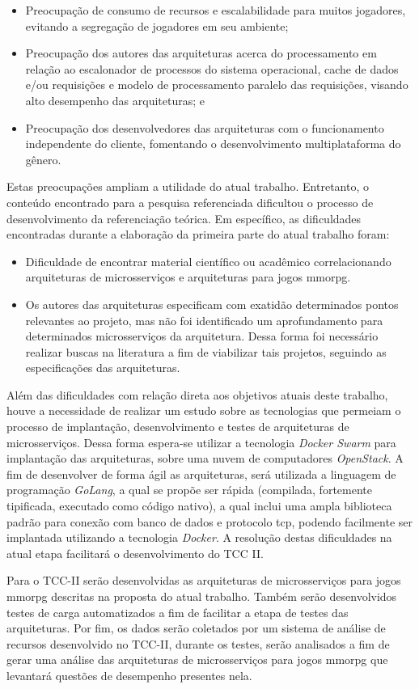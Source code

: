 \begin{itemize}
  \item Preocupação de consumo de recursos e escalabilidade para muitos jogadores, evitando a segregação de jogadores em seu ambiente;
  \item Preocupação dos autores das arquiteturas acerca do processamento em relação ao escalonador de processos do sistema operacional, cache de dados e/ou requisições e modelo de processamento paralelo das requisições, visando alto desempenho das arquiteturas; e
  \item Preocupação dos desenvolvedores das arquiteturas com o funcionamento independente do cliente, fomentando o desenvolvimento multiplataforma do gênero.
\end{itemize}

Estas preocupações ampliam a utilidade do atual trabalho.
%
Entretanto, o conteúdo encontrado para a pesquisa referenciada dificultou o processo de desenvolvimento da referenciação teórica.
%
Em específico, as dificuldades encontradas durante a elaboração da primeira parte do atual trabalho foram:

\begin{itemize}
  \item Dificuldade de encontrar material científico ou acadêmico correlacionando arquiteturas de microsserviços e arquiteturas para jogos \ac{mmorpg}.
  \item Os autores das arquiteturas especificam com exatidão determinados pontos relevantes ao projeto, mas não foi identificado um aprofundamento para determinados microsserviços da arquitetura. Dessa forma foi necessário realizar buscas na literatura a fim de viabilizar tais projetos, seguindo as especificações das arquiteturas.
\end{itemize}

Além das dificuldades com relação direta aos objetivos atuais deste trabalho, houve a necessidade de realizar um estudo sobre as tecnologias que permeiam o processo de implantação, desenvolvimento e testes de arquiteturas de microsserviços.
%
Dessa forma espera-se utilizar a tecnologia \textit{Docker Swarm} para implantação das arquiteturas, sobre uma nuvem de computadores \textit{OpenStack}.
%
A fim de desenvolver de forma ágil as arquiteturas, será utilizada a linguagem de programação \textit{GoLang}, a qual se propõe ser rápida (compilada, fortemente tipificada, executado como código nativo), a qual inclui uma ampla biblioteca padrão para conexão com banco de dados e protocolo \ac{tcp}, podendo facilmente ser implantada utilizando a tecnologia \textit{Docker}.
%
A resolução destas dificuldades na atual etapa facilitará o desenvolvimento do TCC II.

Para o TCC-II serão desenvolvidas as arquiteturas de microsserviços para jogos \ac{mmorpg} descritas na proposta do atual trabalho.
%
Também serão desenvolvidos testes de carga automatizados a fim de facilitar a etapa de testes das arquiteturas.
%
Por fim, os dados serão coletados por um sistema de análise de recursos desenvolvido no TCC-II, durante os testes, serão analisados a fim de gerar uma análise das arquiteturas de microsserviços para jogos \ac{mmorpg} que levantará questões de desempenho presentes nela.


